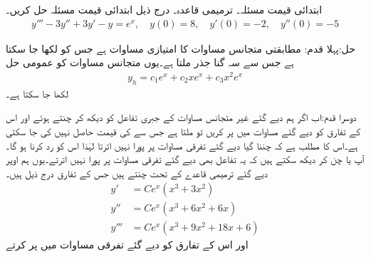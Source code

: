 \quad ابتدائی قیمت مسئلہ۔ ترمیمی قاعدہ۔
درج ذیل ابتدائی قیمت مسئلہ حل کریں۔
\begin{align*}
y'''-3y''+3y'-y=e^{x}, \quad y(0)=8, \quad y'(0)=-2, \quad y''(0)=-5
\end{align*}

حل:پہلا قدم: \quad مطابقتی متجانس مساوات کا امتیازی مساوات  ہے جس کو  لکھا جا سکتا ہے جس سے سہ گنا جذر  ملتا ہے۔یوں  متجانس مساوات کو عمومی حل
\begin{align*}
y_h=c_1e^x+c_2xe^x+c_3x^2e^x
\end{align*}
لکھا جا سکتا ہے۔

دوسرا قدم:\quad اب اگر ہم دیے گئے غیر متجانس مساوات کے جبری تفاعل کو دیکھ کر  چنتے ہوئے  اور اس کے تفارق کو دیے گئے مساوات میں پر  کریں تو  ملتا ہے جس سے  کی قیمت حاصل نہیں کی جا سکتی ہے۔اس کا مطلب ہے کہ چننا گیا  دیے گئے تفرقی مساوات پر پورا نہیں اترتا لہٰذا اس   کو رد کرنا ہو گا۔آپ  یا  چن کر دیکھ سکتے ہیں کہ یہ تفاعل بھی دیے گئے تفرقی مساوات پر پورا نہیں اترتے۔یوں ہم اوپر دیے گئے ترمیمی قاعدے کے تحت  چنتے ہیں جس کے تفارق درج ذیل ہیں۔
\begin{align*}
y'&=Ce^x(x^3+3x^2)\\
y''&=Ce^x(x^3+6x^2+6x)\\
y'''&=Ce^x(x^3+9x^2+18x+6)
\end{align*}
 اور اس کے تفارق کو دیے گئے تفرقی مساوات میں پر کرتے 

